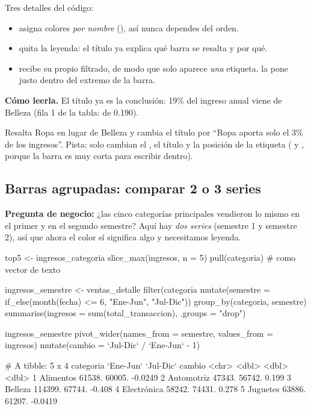 Tres detalles del código:
\begin{itemize}
  \item {} asigna colores \emph{por nombre}
        (), así nunca dependes del orden.
  \item {} quita la leyenda: el título ya explica qué
        barra se resalta y por qué.
  \item {} recibe su propio  filtrado, de modo
        que solo aparece \emph{una} etiqueta.  la pone
        justo dentro del extremo de la barra.
\end{itemize}

\textbf{Cómo leerla.} El título ya es la conclusión: 19\% del ingreso anual
viene de Belleza (fila 1 de la tabla:  de 0.190).

\begin{hazlotu}
Resalta Ropa en lugar de Belleza y cambia el título por ``Ropa aporta solo
el 3\% de los ingresos''. Pista: solo cambian el , el
título y la posición de la etiqueta ( y
, porque la barra es muy corta para escribir
dentro).
\end{hazlotu}

\subsection{Barras agrupadas: comparar 2 o 3 series}

\textbf{Pregunta de negocio:} ¿las cinco categorías principales vendieron lo
mismo en el primer y en el segundo semestre? Aquí hay \emph{dos series}
(semestre 1 y semestre 2), así que ahora el color sí significa algo y
necesitamos leyenda.

\begin{rcode}
top5 <- ingresos_categoria %
  slice_max(ingresos, n = 5) %
  pull(categoria)                    # como vector de texto

ingresos_semestre <- ventas_detalle %
  filter(categoria %
  mutate(semestre = if_else(month(fecha) <= 6, "Ene-Jun", "Jul-Dic")) %
  group_by(categoria, semestre) %
  summarise(ingresos = sum(total_transaccion), .groups = "drop")

ingresos_semestre %
  pivot_wider(names_from = semestre, values_from = ingresos) %
  mutate(cambio = `Jul-Dic` / `Ene-Jun` - 1)
\end{rcode}
\begin{rsalida}
# A tibble: 5 x 4
  categoria   `Ene-Jun` `Jul-Dic`  cambio
  <chr>           <dbl>     <dbl>   <dbl>
1 Alimentos      61538.    60005. -0.0249
2 Automotriz     47343.    56742.  0.199 
3 Belleza       114399.    67744. -0.408 
4 Electrónica    58242.    74431.  0.278 
5 Juguetes       63886.    61207. -0.0419
\end{rsalida}

